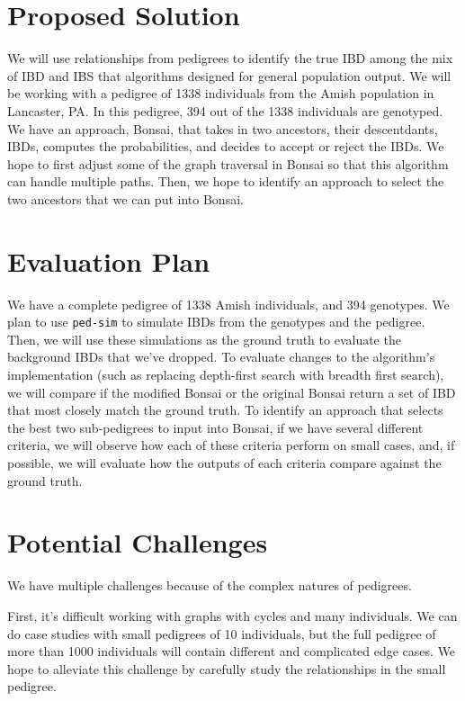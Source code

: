 \documentclass[12pt]{article}
\begin{document}

\section{Proposed Solution}

We will use relationships from pedigrees to identify the true IBD among the mix of IBD and IBS that algorithms designed for general population output. 
We will be working with a pedigree of 1338 individuals from the Amish population in Lancaster, PA. In this pedigree, 394 out of the 1338 individuals are genotyped\cite{Finke2021}. 
We have an approach, Bonsai\cite{Jewett2021}, that takes in two ancestors, their descentdants, IBDs, computes the probabilities, and decides to accept or reject the IBDs. We hope to first adjust some of the graph traversal in Bonsai so that this algorithm can handle multiple paths. 
Then, we hope to identify an approach to select the two ancestors that we can put into Bonsai.  

\section{Evaluation Plan}

We have a complete pedigree of 1338 Amish individuals, and 394 genotypes. We plan to use \texttt{ped-sim} to simulate IBDs from the genotypes and the pedigree. Then, we will use these simulations as the ground truth to evaluate the background IBDs that we've dropped.
To evaluate changes to the algorithm's implementation (such as replacing depth-first search 
with breadth first search), we will compare if the modified Bonsai or the original Bonsai return a set of IBD that most closely match the ground truth. 
To identify an approach that selects the best two sub-pedigrees to input into Bonsai, if we have several different criteria, we will observe how each of these criteria perform on small cases, and, if possible, we will evaluate how the outputs of each criteria compare against the ground truth. 

\section{Potential Challenges} 

We have multiple challenges because of the complex natures of pedigrees.

First, it's difficult working with graphs with cycles and many individuals. We can do case studies with small pedigrees of 10 individuals, but the full pedigree of more than 1000 individuals will contain different and complicated edge cases. We hope to alleviate this challenge by carefully study the relationships in the small pedigree. 
\end{document}
